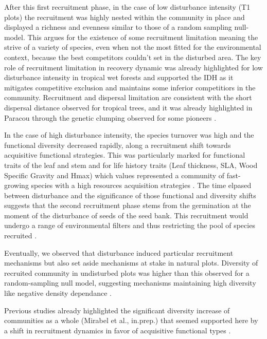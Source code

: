 \documentclass[fleqn,10pt]{ArtEcoFoG} %
\begin{document}
After this first recruitment phase, in the case of low disturbance
intensity (T1 plots) the recruitment was highly nested within the
community in place and displayed a richness and evenness similar to
those of a random sampling null-model. This argues for the existence of
some recruitment limitation meaning the strive of a variety of species,
even when not the most fitted for the environmental context, because the
best competitors couldn't set in the disturbed area. The key role of
recruitment limitation in recovery dynamic was already highlighted for
low disturbance intensity in tropical wet forests
\citep{Hubbell1999, Sheil2003, Bongers2009} and supported the IDH as it
mitigates competitive exclusion and maintains some inferior competitiors
in the community. Recruitment and dispersal limitation are consistent
with the short dispersal distance observed for tropical trees, and it
was already highlighted in Paracou through the genetic clumping observed
for some pioneers \citep{Leclerc2015, Scotti2015a}.

In the case of high disturbance intensity, the species turnover was high
and the functional diversity decreased rapidly, along a recruitment
shift towards acquisitive functional strategies. This was particularly
marked for functional traits of the leaf and stem and for life history
traits (Leaf thickness, SLA, Wood Specific Gravity and Hmax) which
values represented a community of fast-growing species with a high
resources acquisition strategies
\citep{Wright2004, Chave2009b, Herault2011, Reich2014}. The time elpased
between disturbance and the significance of those functional and
diversity shifts suggests that the second recruitment phase stems from
the germination at the moment of the disturbance of seeds of the seed
bank. This recruitment would undergo a range of environmental filters
and thus restricting the pool of species recruited \citep{Molino2001}.

Eventually, we observed that disturbance induced particular recruitment
mechanisms but also set aside mechanisms at stake in natural plots.
Diversity of recruited community in undisturbed plots was higher than
this observed for a random-sampling null model, suggesting mechanisms
maintaining high diversity like negative density dependance
\citep{Harms2000}.

Previous studies already highlighted the significant diversity increase
of communities as a whole (Mirabel et al., in.prep.) that seemed
supported here by a shift in recruitment dynamics in favor of
acquisitive functional types \citep{TerSteege2001}.
\end{document}
